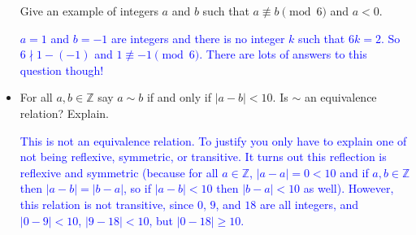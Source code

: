 \documentclass[10pt]{article}
\newcommand{\Z}{\mathbb{Z}}
\newcommand{\blue}{\textcolor{blue}}
\newcommand{\bs}{\begin{solution}}
\begin{document}
\begin{itemize}
Give an example of integers $a$ and $b$ such that $a\not\equiv b\pmod{6} $ and $a<0$.
\bs\blue{$a = 1$ and $b=-1$ are integers and there is no integer $k$ such that $6k = 2$. So $6\nmid 1-(-1)$ and $1\not\equiv -1 \pmod{6}$. There are lots of answers to this question though!}\end{solution}
\vspace{1in}
\newpage


\item[S5-2] For all $a,b\in \Z$ say $a\sim b$ if and only if $|a-b|<10$.  Is $\sim$ an equivalence relation? Explain.
\bs \blue{This is not an equivalence relation. To justify you only have to explain one of not being reflexive, symmetric, or transitive. It turns out this reflection is reflexive and symmetric (because for all $a\in\Z$, $|a-a|=0<10$ and if $a,b\in\Z$ then $|a-b|=|b-a|$, so if $|a-b|<10$ then $|b-a|<10$ as well). However, this relation is not transitive, since $0$, $9$, and $18$ are all integers, and $|0-9|<10$, $|9-18|<10$, but $|0-18|\geq 10$.} \end{solution}

\end{itemize}
\end{document}
